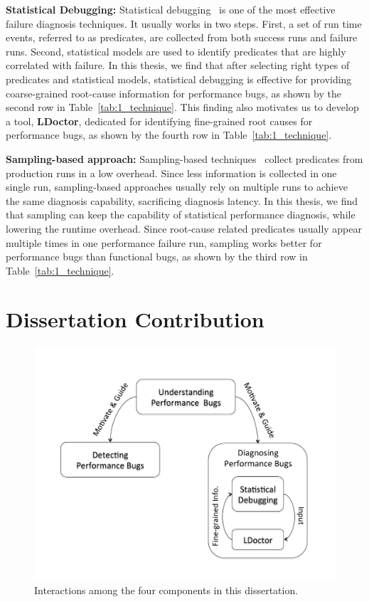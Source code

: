 {\bf Statistical Debugging:}
Statistical debugging~\citep{liblit03,liblit05,CCI,tarantula1,tarantula2,tarantula.darko,joy.asplos13} 
is one of the most effective failure diagnosis techniques. 
It usually works in two steps. 
First, a set of run time events, referred to as predicates, are collected from both success runs and failure runs.
Second, statistical models are used to identify predicates that are highly correlated with failure. 
In this thesis, we find that after selecting right types of predicates and statistical models, 
statistical debugging is effective for providing coarse-grained root-cause information for performance bugs, 
as shown by the second row in Table~\ref{tab:1_technique}. 
This finding also motivates us to develop a tool, {\bf LDoctor}, 
dedicated for identifying fine-grained root causes for performance bugs, as shown by the fourth row in Table~\ref{tab:1_technique}.

{\bf Sampling-based approach:}
Sampling-based techniques~\citep{liblit03,liblit05,CCI,joy.asplos13} collect predicates from production runs in a low overhead. 
Since less information is collected in one single run, 
sampling-based approaches usually rely on multiple runs to achieve the same diagnosis capability, 
sacrificing diagnosis latency. 
In this thesis, we find that sampling can keep the capability of statistical performance diagnosis, 
while lowering the runtime overhead. 
Since root-cause related predicates usually appear multiple times in one performance failure run, 
sampling works better for performance bugs than functional bugs, 
as shown by the third row in Table~\ref{tab:1_technique}. 

\section{Dissertation Contribution}


\begin{figure}[t!]
\begin{center}
\includegraphics[width=4.5in]{figures/overview}
\caption{Interactions among the four components in this dissertation.}
\label{fig:overview}
\end{center}
\end{figure}

